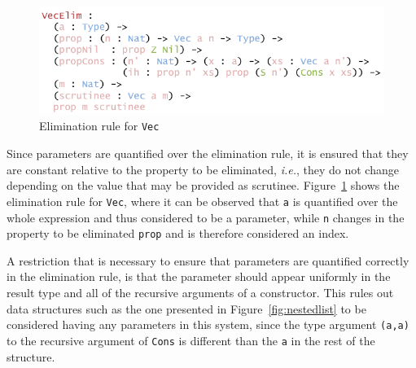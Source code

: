 \documentclass{ituthesis}
\newcommand{\ttconstructor}[1]{\textcolor{constructor-color}{\texttt{#1}}}
\newcommand{\tttype}[1]{\textcolor{type-color}{\texttt{#1}}}
\newcommand{\ttvar}[1]{\textcolor{local-var-color}{\texttt{#1}}}
\theoremstyle{break}
\begin{document}
\begin{figure}[ht]
\begin{center}
    \includegraphics[scale=0.5]{Figures/VectorElim.png}
\end{center}
\caption{Elimination rule for \tttype{Vec}}
\label{fig:vecelim}
\end{figure}

Since parameters are quantified over the elimination rule, it is ensured that they are constant relative to the property to be eliminated, \textit{i.e.}, they do not change depending on the value that may be provided as scrutinee.
Figure~\ref{fig:vecelim} shows the elimination rule for \tttype{Vec}, where it can be observed that \ttvar{a} is quantified over the whole expression and thus considered to be a parameter,
while \ttvar{n} changes in the property to be eliminated \ttvar{prop} and is therefore considered an index.

A restriction that is necessary to ensure that parameters are quantified correctly in the elimination rule, is that the parameter should appear uniformly in the result type and all of the recursive arguments of a constructor.
This rules out data structures such as the one presented in Figure~\ref{fig:nestedlist} to be considered having any parameters in this system, since the type argument \tttype{(}\ttvar{a}\tttype{,}\ttvar{a}\tttype{)} to the recursive argument of \ttconstructor{Cons} is different than the \ttvar{a} in the rest of the structure.
\end{document}
